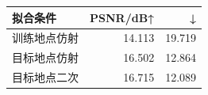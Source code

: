\begin{tabular}{@{}lrr@{}}
\toprule
拟合条件 & PSNR/dB↑ & \dE{}↓\\
\midrule
训练地点仿射 & 14.113 & 19.719\\
目标地点仿射 & 16.502 & 12.864\\
目标地点二次 & 16.715 & 12.089\\
\bottomrule
\end{tabular}
